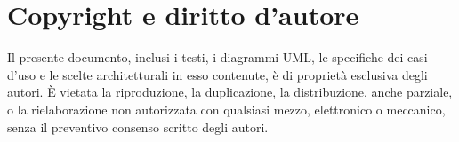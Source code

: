 \section{Copyright e diritto d'autore}
Il presente documento, inclusi i testi, i diagrammi UML, le specifiche dei casi d'uso e le scelte architetturali in esso contenute, \`e di propriet\`a esclusiva degli autori. \`E vietata la riproduzione, la duplicazione, la distribuzione, anche parziale, o la rielaborazione non autorizzata con qualsiasi mezzo, elettronico o meccanico, senza il preventivo consenso scritto degli autori.